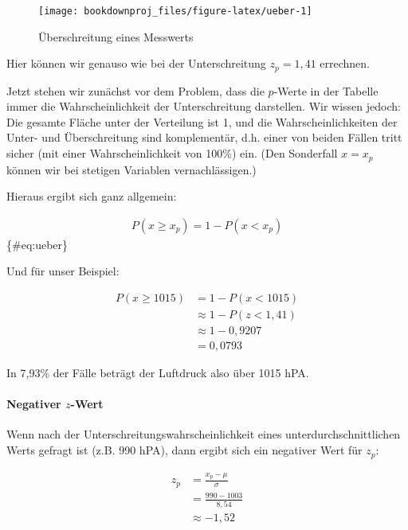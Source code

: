 \documentclass[
  ngerman,
]{article}
\begin{document}
\begin{figure}[h]

{\centering \texttt{[image: bookdownproj\_files/figure-latex/ueber-1]} 

}

\caption{Überschreitung eines Messwerts}\label{fig:ueber}
\end{figure}

Hier können wir genauso wie bei der Unterschreitung \(z_p=1,41\) errechnen.

Jetzt stehen wir zunächst vor dem Problem, dass die \(p\)-Werte in der Tabelle immer die Wahrscheinlichkeit der Unterschreitung darstellen. Wir wissen jedoch: Die gesamte Fläche unter der Verteilung ist 1, und die Wahrscheinlichkeiten der Unter- und Überschreitung sind komplementär, d.h. einer von beiden Fällen tritt sicher (mit einer Wahrscheinlichkeit von 100\%) ein. (Den Sonderfall \(x=x_p\) können wir bei stetigen Variablen vernachlässigen.)

Hieraus ergibt sich ganz allgemein:

\[
  \begin{aligned}
    P(x \geq x_p) = 1-P(x<x_p)
  \end{aligned}
\]\{\#eq:ueber\}

Und für unser Beispiel:

\[
  \begin{aligned}
    P(x \geq 1015) &= 1-P(x < 1015) \\
    &\approx1-P(z < 1,41)\\
    &\approx1-0,9207\\
    &= 0,0793
  \end{aligned}
\]

In 7,93\% der Fälle beträgt der Luftdruck also über 1015 hPA.

\hypertarget{negativer-z-wert}{%
\paragraph{\texorpdfstring{Negativer \(z\)-Wert}{Negativer z-Wert}}\label{negativer-z-wert}}

Wenn nach der Unterschreitungswahrscheinlichkeit eines unterdurchschnittlichen Werts gefragt ist (z.B. 990 hPA), dann ergibt sich ein negativer Wert für \(z_p\):

\begin{equation}
  \begin{aligned}
    z_p &= \frac{x_p-\mu}{\sigma} \\[4pt]
        &= \frac{990-1003}{8,54} \\[4pt]
        &\approx -1,52
  \end{aligned}
\end{equation}
\end{document}
